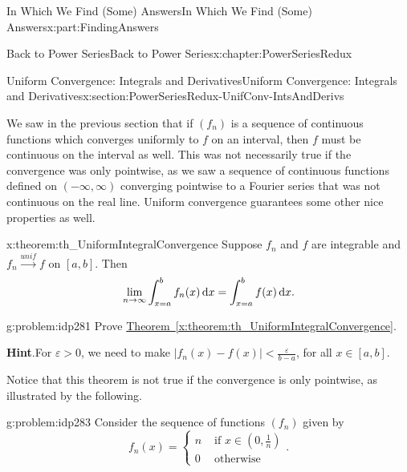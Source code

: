 \documentclass[oneside,10pt,]{book}
\newcommand{\blocktitlefont}{\relax}
\newcommand{\xreffont}{\relax}
\numberwithin{equation}{section}
\newcommand{\dx}[1]{\,{\rm d}#1}
\newcommand{\eps}{\varepsilon}
\newcommand{\unif}{\stackrel{unif}{\longrightarrow}}
\newcommand{\lt}{<}
\newcommand{\amp}{&}
\begin{document}
\begin{partptx}{In Which We Find (Some) Answers}{}{In Which We Find (Some) Answers}{}{}{x:part:FindingAnswers}
\begin{chapterptx}{Back to Power Series}{}{Back to Power Series}{}{}{x:chapter:PowerSeriesRedux}
\typeout{************************************************}
%
\begin{sectionptx}{Uniform Convergence: Integrals and Derivatives}{}{Uniform Convergence: Integrals and Derivatives}{}{}{x:section:PowerSeriesRedux-UnifConv-IntsAndDerivs}
\begin{introduction}{}%
We saw in the previous section that if \(\left(f_n\right)\) is a sequence of continuous functions which converges uniformly to \(f\) on an interval, then \(f\) must be continuous on the interval as well. This was not necessarily true if the convergence was only pointwise, as we saw a sequence of continuous functions defined on \((-\infty,\infty)\) converging pointwise to a Fourier series that was not continuous on the real line. Uniform convergence guarantees some other nice properties as well.%
\begin{theorem}{}{}{x:theorem:th_UniformIntegralConvergence}%
 Suppose \(f_n\) and \(f\) are integrable and \(f_n\unif f\) on \([a,b]\). Then%
\begin{equation*}
\lim_{n\rightarrow\infty}\int_{x=a}^b f_n(x)\dx{ x}=\int_{x=a}^bf(x)\dx{ x}. {}
\end{equation*}
%
\end{theorem}
\begin{problem}{}{g:problem:idp281}%
 Prove \hyperref[x:theorem:th_UniformIntegralConvergence]{Theorem~{\xreffont\ref{x:theorem:th_UniformIntegralConvergence}}}.%
\par\smallskip%
\noindent\textbf{\blocktitlefont Hint}.\hypertarget{g:hint:idp282}{}\quad{}For \(\eps>0\), we need to make \(|f_n(x)-f(x)|\lt \frac{\eps}{b-a}\), for all \(x\in[a,b]\).%
\end{problem}
Notice that this theorem is not true if the convergence is only pointwise, as illustrated by the following.%
\begin{problem}{}{g:problem:idp283}%
 Consider the sequence of functions \(\left(f_n\right)\) given by%
\begin{equation*}
f_n(x)= \begin{cases}n\amp \text{ if } x\in\left(0,\frac{1}{n}\right)\\ 0\amp \text{ otherwise } \end{cases} \text{.}
\end{equation*}
%
\begin{enumerate}[label=(\alph*)]

\end{enumerate}
\end{problem}
\end{introduction}
\end{sectionptx}
\end{chapterptx}
\end{partptx}
\end{document}
